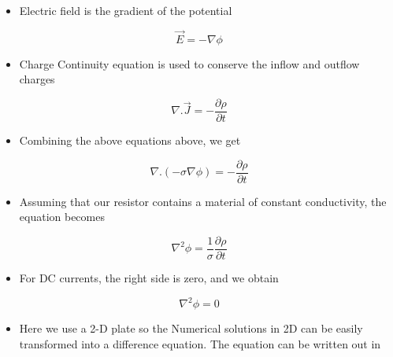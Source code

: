 \documentclass[11pt, a4paper]{article}
\begin{document}
    \begin{itemize}
    \item
      Electric field is the gradient of the potential
    \end{itemize}
    
    \begin{equation}
    \vec{E} = -\nabla{\phi}
       \end{equation}
    
    \begin{itemize}
    \item
      Charge Continuity equation is used to conserve the inflow and outflow
      charges
    \end{itemize}
    
    \begin{equation}
    \nabla.\vec{J} = -\frac{\partial \rho}{\partial t}
       \end{equation}
    
    \begin{itemize}
    \item
      Combining the above equations above, we get
    \end{itemize}
    
    \begin{equation}
    \nabla.(-\sigma\nabla\phi) = -\frac{\partial \rho}{\partial t}
       \end{equation}
    
    \begin{itemize}
    \item
      Assuming that our resistor contains a material of constant
      conductivity, the equation becomes
    \end{itemize}
    
    \begin{equation}
    \nabla^{2}\phi = \frac{1}{\sigma}\frac{\partial \rho}{\partial t}
       \end{equation}
    
    \begin{itemize}
    \item
      For DC currents, the right side is zero, and we obtain
    \end{itemize}
    
    \begin{equation}
    \nabla^{2}\phi = 0
       \end{equation}
    
    \begin{itemize}
    \item
      Here we use a 2-D plate so the Numerical solutions in 2D can be easily
      transformed into a difference equation. The equation can be written
      out in
    \end{itemize}
    
\end{document}
